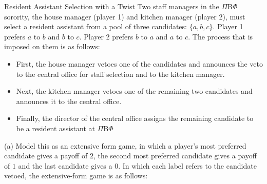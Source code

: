 \documentclass[10pt]{extarticle}
\begin{document}
  \begin{problem}{Resident Assistant Selection with a Twist}
    Two staff managers in the $\Pi $B$ \Phi$ sorority, the house manager (player 1) and kitchen manager (player 2), must select a resident assistant from a pool of three candidates: $\{a,b,c\}$. Player 1 prefers $a$ to $b$ and $b$ to $c$. Player 2 prefers $b$ to $a$ and $a$ to $c$. The process that is imposed on them is as follows:
    \begin{itemize}
      \item First, the house manager vetoes one of the candidates and announces the veto to the central office for staff selection and to the kitchen manager.
      \item Next, the kitchen manager vetoes one of the remaining two candidates and announces it to the central office.
      \item Finally, the director of the central office assigns the remaining candidate to be a resident assistant at $\Pi $B$\Phi$
    \end{itemize}
    \begin{problem}{(a)}
      Model this as an extensive form game, in which a player's most preferred candidate gives a payoff of $2$, the second most preferred candidate gives a payoff of $1$ and the last candidate gives a $0$.
      \tcblower
      In which each label refers to the candidate vetoed, the extensive-form game is as follows:
      \begin{center}
\end{center}
\end{problem}
\end{problem}
\end{document}
